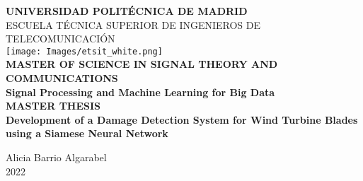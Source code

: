 \thispagestyle{empty}
\afterpage{\blankpage}

\thispagestyle{empty}

\noindent\hspace*{\centeroffset}\begin{minipage}{\textwidth}
	
		\centering
		\LARGE{\textbf{UNIVERSIDAD POLITÉCNICA DE MADRID}}\\[0.7cm]
		\Large{ESCUELA TÉCNICA SUPERIOR DE INGENIEROS DE TELECOMUNICACIÓN}\\[0.7cm]
		\texttt{[image: Images/etsit\_white.png]}\\[1cm]
	    \LARGE{\textbf{MASTER OF SCIENCE IN SIGNAL THEORY AND COMMUNICATIONS\\}}
		\Large{\textbf{Signal Processing and Machine Learning for Big Data}}\\[0.5cm]
		\LARGE{\textbf{MASTER THESIS}\\[3cm]}
		\LARGE{\textbf{Development of a Damage Detection System for Wind Turbine Blades using a Siamese Neural Network}}\\
	
\end{minipage}

\vspace{2.6cm}
\noindent\hspace*{\centeroffset}
\begin{minipage}{\textwidth}
	\centering
	\Large{Alicia Barrio Algarabel}\\[2ex]
	\large{2022}
    
\end{minipage}
\thispagestyle{empty}
\afterpage{\blankpage}
